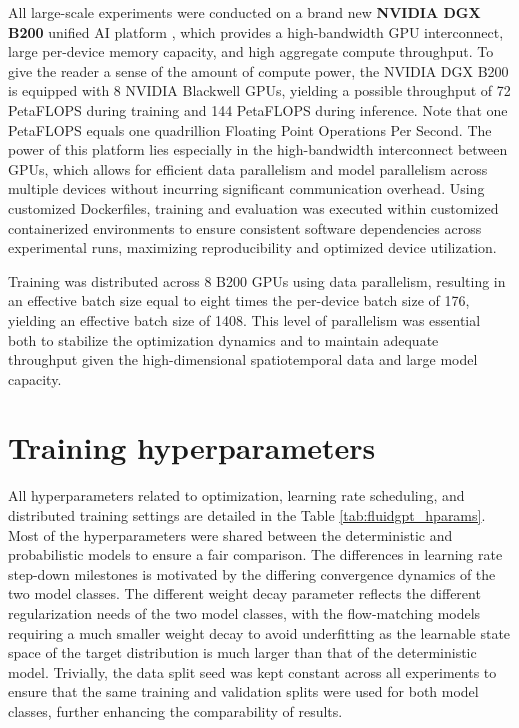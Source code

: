 All large-scale experiments were conducted on a brand new \textbf{NVIDIA DGX B200} unified AI platform \cite{nvidia2024dgxb200}, which provides a high-bandwidth GPU interconnect, large per-device memory capacity, and high aggregate compute throughput. To give the reader a sense of the amount of compute power, the NVIDIA DGX B200 is equipped with 8 NVIDIA Blackwell GPUs, yielding a possible throughput of 72 PetaFLOPS during training and 144 PetaFLOPS during inference. Note that one PetaFLOPS equals one quadrillion Floating Point Operations Per Second. The power of this platform lies especially in the high-bandwidth interconnect between GPUs, which allows for efficient data parallelism and model parallelism across multiple devices without incurring significant communication overhead. Using customized Dockerfiles, training and evaluation was executed within customized containerized environments to ensure consistent software dependencies across experimental runs, maximizing reproducibility and optimized device utilization. 

Training was distributed across 8 B200 GPUs using data parallelism, resulting in an effective batch size equal to eight times the per-device batch size of 176, yielding an effective batch size of 1408. This level of parallelism was essential both to stabilize the optimization dynamics and to maintain adequate throughput given the high-dimensional spatiotemporal data and large model capacity.

\section{Training hyperparameters}

All hyperparameters related to optimization, learning rate scheduling, and distributed training settings are detailed in the Table \ref{tab:fluidgpt_hparams}. Most of the hyperparameters were shared between the deterministic and probabilistic models to ensure a fair comparison. The differences in learning rate step-down milestones is motivated by the differing convergence dynamics of the two model classes. The different weight decay parameter reflects the different regularization needs of the two model classes, with the flow-matching models requiring a much smaller weight decay to avoid underfitting as the learnable state space of the target distribution is much larger than that of the deterministic model.
Trivially, the data split seed was kept constant across all experiments to ensure that the same training and validation splits were used for both model classes, further enhancing the comparability of results.

